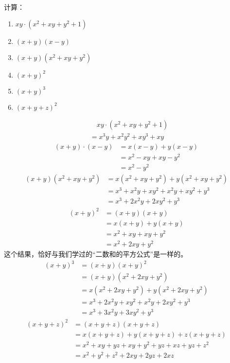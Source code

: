 \begin{example}
计算：
 \begin{multicols}{2}
\begin{enumerate}
    \item $xy\cdot (x^2+xy+y^2+1)$
    \item $(x+y)(x-y)$
    \item $(x+y)(x^2+xy+y^2)$
    \item $(x+y)^2$
    \item $(x+y)^3$
    \item $(x+y+z)^2$
\end{enumerate}
    \end{multicols}

\end{example}

\begin{solution}
\begin{align*}
     &\quad    xy\cdot (x^2+xy+y^2+1)\\
     &=x^3y+x^2y^2+xy^3+xy \tag{分配律}
    \end{align*}
\begin{align*}
        (x+y)\cdot (x-y)&=x(x-y)+y(x-y) \tag{分配律}\\
        &=x^2-xy+xy-y^2  \\
        &=x^2-y^2\tag{合并同类项法则}
    \end{align*}
\begin{align*}
        (x+y)(x^2+xy+y^2)&= x(x^2+xy+y^2)+y(x^2+xy+y^2)\\
        &=x^3+x^2y+xy^2+x^2y+xy^2+y^3\\
        &=x^3+2x^2y+2xy^2+y^3
    \end{align*}
\begin{align*}
        (x+y)^2&=(x+y)(x+y)\\
        &=x(x+y)+y(x+y)\\
        &=x^2+xy+xy+y^2\\
        &=x^2+2xy+y^2
    \end{align*}
    这个结果，恰好与我们学过的“二数和的平方公式”是一样的。
\begin{align*}
        (x+y)^3&=(x+y)(x+y)^2\\
        &=(x+y)(x^2+2xy+y^2)\\
        &=x(x^2+2xy+y^2)+y(x^2+2xy+y^2)\\
        &=x^3+2x^2y+xy^2+x^2y+2xy^2+y^3     \\
        &=x^3+3x^2y+3xy^2+y^3
    \end{align*}
\begin{align*}
        (x+y+z)^2&=(x+y+z)(x+y+z)\\
        &=x(x+y+z)+y(x+y+z)+z(x+y+z)\\
        &=x^2+xy+yz+xy+y^2+yz+xz+yz+z^2\\
        &=x^2+y^2+z^2+2xy+2yz+2xz    \\
    \end{align*}
\end{solution}

